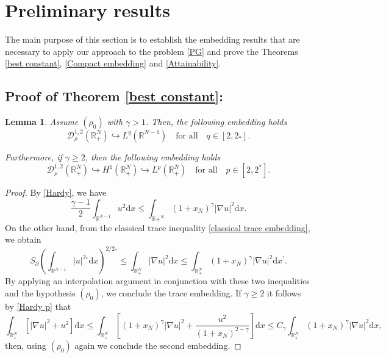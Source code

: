 \documentclass[12pt,reqno]{amsart}
\newtheorem{lemma}[theorem]{Lemma}
\begin{document}
%
%

\section{Preliminary results}

The main purpose of this section is to establish the embedding results that are necessary to apply our approach to the problem \eqref{PG} and prove the Theorems \ref{best constant}, \ref{Compact embedding} and \ref{Attainability}.

\subsection{Proof of Theorem \ref{best constant}:}

\begin{lemma}\label{embedding}
Assume $(\rho_0)$ with $\gamma>1$. Then, the following embedding holds
$$
\mathcal{D}_\rho^{1,2}(\mathds{R}^N_+)\hookrightarrow L^q(\mathds{R}^{N-1})\quad \mbox{for all}\quad q\in[2,2_\ast]. 
$$

Furthermore, if $\gamma\geq 2$, then the following embedding holds
$$
\mathcal{D}_\rho^{1,2}(\mathds{R}^N_+)\hookrightarrow H^1(\mathds{R}^N_+)\hookrightarrow L^p(\mathds{R}^{N}_+)\quad \mbox{for all}\quad p \in [2,2^\ast].
$$
\end{lemma}

\begin{proof} By \eqref{Hardy}, we have
\begin{equation*}
\frac{\gamma - 1}{2} \int_{\mathds{R}^{N-1}} u^2 \mathrm{d}x
\leq \int_{\mathds{R}{+}^N} (1 + x_N)^\gamma |\nabla u|^2 \mathrm{d}x.
\end{equation*}
On the other hand, from the classical trace inequality \eqref{classical trace embedding}, we obtain
\begin{equation}\label{ineq}
S_{\partial} \left( \int_{\mathds{R}^{N-1}} |u|^{2_\ast}  \mathrm{d}x \right)^{2/2_\ast}
\leq \int_{\mathds{R}^N_+} |\nabla u|^2  \mathrm{d}x
\leq \int_{\mathds{R}^N_+} (1 + x_N)^\gamma |\nabla u|^2  \mathrm{d}x^\prime.
\end{equation}
By applying an interpolation argument in conjunction with these two inequalities and the hypothesis $(\rho_0)$, we conclude the trace embedding. If $\gamma\geq 2$ it follows by \eqref{Hardy p} that
\begin{equation*}
    \int_{\mathds{R}^N_+}[|\nabla u|^2+u^2]\mathrm{d}x\leq \int_{\mathds{R}^N_+}\left[(1+x_N)^\gamma|\nabla u|^2+\frac{u^2}{(1+x_N)^{2-\gamma}}\right]\mathrm{d}x\leq C_\gamma \int_{\mathds{R}^N_+}(1+x_N)^\gamma|\nabla u|^2\mathrm{d}x,
\end{equation*}
then, using $(\rho_0)$ again we conclude the second embedding.
\end{proof}
\end{document}
